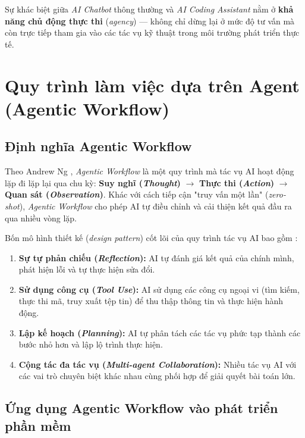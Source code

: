 \documentclass[13pt,a4paper,oneside]{extreport}
\numberwithin{equation}{chapter}
\numberwithin{figure}{chapter}
\numberwithin{table}{chapter}
\begin{document}
Sự khác biệt giữa \textit{AI Chatbot} thông thường và \textit{AI Coding Assistant} nằm ở \textbf{khả năng chủ động thực thi} (\textit{agency}) — không chỉ dừng lại ở mức độ tư vấn mà còn trực tiếp tham gia vào các tác vụ kỹ thuật trong môi trường phát triển thực tế.

\section{Quy trình làm việc dựa trên Agent (Agentic Workflow)}

\subsection{Định nghĩa Agentic Workflow}

Theo Andrew Ng \cite{ref-agent}, \textit{Agentic Workflow} là một quy trình mà tác vụ AI hoạt động lặp đi lặp lại qua chu kỳ: \textbf{Suy nghĩ (\textit{Thought})} $\rightarrow$ \textbf{Thực thi (\textit{Action})} $\rightarrow$ \textbf{Quan sát (\textit{Observation})}. Khác với cách tiếp cận "truy vấn một lần" (\textit{zero-shot}), \textit{Agentic Workflow} cho phép AI tự điều chỉnh và cải thiện kết quả đầu ra qua nhiều vòng lặp.

Bốn mô hình thiết kế (\textit{design pattern}) cốt lõi của quy trình tác vụ AI bao gồm \cite{ref-agent}:

\begin{enumerate}
    \item \textbf{Sự tự phản chiếu (\textit{Reflection}):} AI tự đánh giá kết quả của chính mình, phát hiện lỗi và tự thực hiện sửa đổi.
    \item \textbf{Sử dụng công cụ (\textit{Tool Use}):} AI sử dụng các công cụ ngoại vi (tìm kiếm, thực thi mã, truy xuất tệp tin) để thu thập thông tin và thực hiện hành động.
    \item \textbf{Lập kế hoạch (\textit{Planning}):} AI tự phân tách các tác vụ phức tạp thành các bước nhỏ hơn và lập lộ trình thực hiện.
    \item \textbf{Cộng tác đa tác vụ (\textit{Multi-agent Collaboration}):} Nhiều tác vụ AI với các vai trò chuyên biệt khác nhau cùng phối hợp để giải quyết bài toán lớn.
\end{enumerate}

\subsection{Ứng dụng Agentic Workflow vào phát triển phần mềm}
\end{document}
